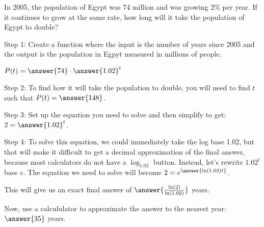 \documentclass{ximera}
\author{Ivo Terek, Elizabeth Miller}
\begin{document}
\licenseY

  In 2005, the population of Egypt was 74 million and was growing $2\%$ per year. If it continues to grow at the same rate, how long will it take the population of Egypt to double? 
 
   \begin{exercise}
	Step 1:  Create a function where the input is the number of years since 2005 and the output is the population in Egpyt measured in millions of people.

		$P(t)=\answer{74} \cdot \answer{1.02}^t$
	\begin{exercise}
	Step 2:  To find how it will take the population to double, you will need to find $t$ such that $P(t)=\answer{148}$.
	\begin{exercise}
	Step 3:  Set up the equation you need to solve and then simplify to get: $2=\answer{1.02}^t$.  
	\begin{exercise}
	Step 4: To solve this equation, we could immediately take the log base 1.02, but that will make it difficult to get a decimal approximation of the final answer, because most calculators do not have a $\log_{1.02}$ button.  Instead, let's rewrite $1.02^t$ base $e$.  The equation we need to solve will become $2=e^{\answer{\ln(1.02)t}}$.
	\begin{exercise}
	This will give us an exact final answer of $\answer{\frac{\ln(2)}{\ln(1.02)}}$ years.

	Now, use a calcululator to approximate the answer to the nearest year: $\answer{35}$ \calcHW years.

 	\end{exercise}
 	\end{exercise}
 	\end{exercise}
 	\end{exercise}
\end{exercise}
\end{document}
